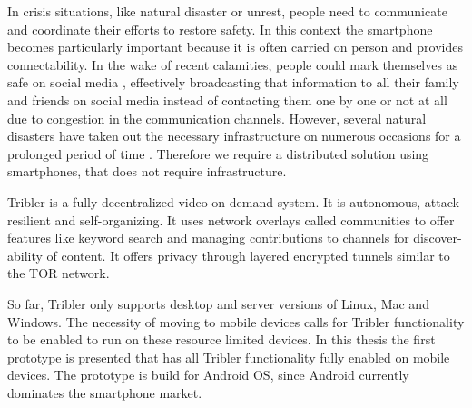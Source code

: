 In crisis situations, like natural disaster or unrest, people need to communicate and coordinate their efforts to restore safety.
In this context the smartphone becomes particularly important because it is often carried on person and provides connectability.
In the wake of recent calamities, people could mark themselves as safe on social media \cite{fb-safety-check}, effectively broadcasting that information to all their family and friends on social media instead of contacting them one by one or not at all due to congestion in the communication channels.
However, several natural disasters have taken out the necessary infrastructure on numerous occasions for a prolonged period of time \cite{renesys2005katrina}.
Therefore we require a distributed solution using smartphones, that does not require infrastructure.


Tribler is a fully decentralized video-on-demand system. \cite{TriblerOverviewJournal, tribler2014play, tribler-anon-hd}
It is autonomous, attack-resilient and self-organizing. \cite{votecast, tribler-gossip}
It uses network overlays called communities to offer features like keyword search and managing contributions to channels for discover-ability of content.
It offers privacy through layered encrypted tunnels similar to the TOR network.\cite{tor_bittorrent, tribler2014at3, dingledine2004tor, dingledine2006design}

So far, Tribler only supports desktop and server versions of Linux, Mac and Windows.
The necessity of moving to mobile devices calls for Tribler functionality to be enabled to run on these resource limited devices.
In this thesis the first prototype is presented that has all Tribler functionality fully enabled on mobile devices.
The prototype is build for Android OS, since Android currently dominates the smartphone market.

